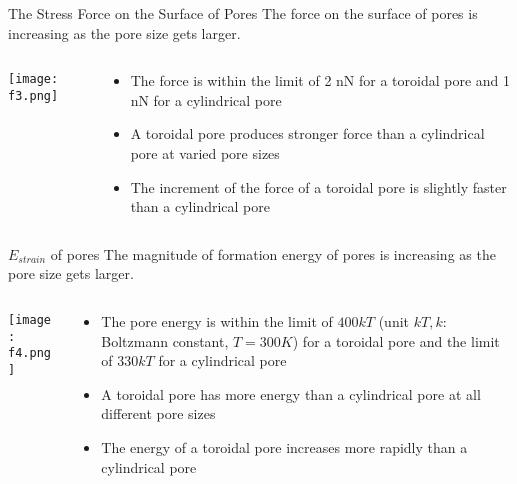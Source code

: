 \documentclass[UTF8]{ctexbeamer}
\begin{document}
\begin{frame}{The Stress Force on the Surface of Pores}
The force on the surface of pores is increasing as the pore size gets larger.
\vspace{0.5cm}
	\begin{columns}
		\begin{column}{0.4\textwidth}
			\texttt{[image: f3.png]}
		\end{column}
	\hspace{-1.5cm}
		\begin{column}{0.6\textwidth}
			\begin{itemize}
				\item The force is within the limit of 2 nN for a toroidal pore and 1 nN for a cylindrical pore
				\item A toroidal pore produces stronger force than a cylindrical pore at varied pore sizes
				\item The increment of the force of a toroidal pore is slightly faster than a cylindrical pore
			\end{itemize}
		\end{column}	
	\end{columns}
\end{frame}

\begin{frame}{ $ E_{strain}  $ of pores}
The magnitude of formation energy of pores is increasing as the pore size gets larger.
\vspace{0.5cm}
\begin{columns}
	\begin{column}{0.4\textwidth}
		\texttt{[image: f4.png]}
	\end{column}
	\hspace{-1.5cm}
	\begin{column}{0.6\textwidth}
		\begin{itemize}
			\item The pore energy is within the limit of $ 400 kT $ (unit $ kT , k$: Boltzmann constant, $ T=300K $) for a toroidal pore and the limit of $ 330 kT $ for a cylindrical pore
			\item A toroidal pore has more energy than a cylindrical pore at all different pore sizes
			\item The energy of a toroidal pore increases more rapidly than a cylindrical pore
		\end{itemize}
	\end{column}	
\end{columns}
\end{frame}
\end{document}
